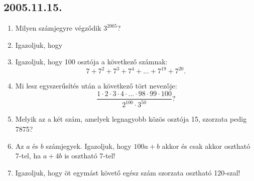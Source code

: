 \subsection*{2005.11.15.}
\begin{enumerate}
\item Milyen számjegyre végződik $3^{2005}$?

\item Igazoljuk, hogy


\item Igazoljuk, hogy 100 osztója a következő számnak: $$7+7^2+7^3+7^4+...+7^{19}+7^{20}.$$

\item Mi lesz egyszerűsítés után a következő tört nevezője: $$\frac{1 \cdot 2 \cdot 3 \cdot 4 \cdot ... \cdot 98 \cdot 99 \cdot 100}{2^{100} \cdot 3^{50}}?$$

\item Melyik az a két szám, amelyek legnagyobb közös osztója 15, szorzata pedig 7875?

\item Az $a$ és $b$ számjegyek. Igazoljuk, hogy $100a+b$ akkor és csak akkor osztható 7-tel, ha $a+4b$ is osztható 7-tel!

\item Igazoljuk, hogy öt egymást követő egész szám szorzata osztható 120-szal! 
\end{enumerate}


